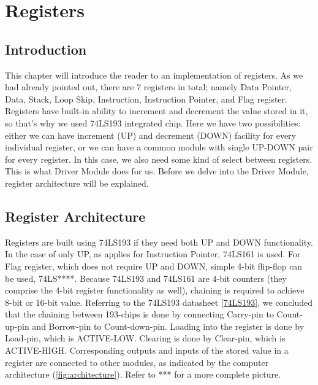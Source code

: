 \section{Registers} \label{sec:registers}
\subsection{Introduction}
This chapter will introduce the reader to an implementation of registers. As we had already pointed out, there are 7 registers in total; namely Data Pointer, Data, Stack, Loop Skip, Instruction, Instruction Pointer, and Flag register. Registers have built-in ability to increment and decrement the value stored in it, so that's why we used 74LS193 integrated chip. Here we have two possibilities: either we can have increment (UP) and decrement (DOWN) facility for every individual register, or we can have a common module with single UP-DOWN pair for every register. In this case, we also need some kind of select between registers. This is what Driver Module does for us. Before we delve into the Driver Module, register architecture will be explained.

\subsection{Register Architecture}
Registers are built using 74LS193 if they need both UP and DOWN functionality. In the case of only UP, as applies for Instruction Pointer, 74LS161 is used. For Flag register, which does not require UP and DOWN, simple 4-bit flip-flop can be used, 74LS****. Because 74LS193 and 74LS161 are 4-bit counters (they comprise the 4-bit register functionality as well), chaining is required to achieve 8-bit or 16-bit value. Referring to the 74LS193 datasheet \ref{74LS193}, we concluded that the chaining between 193-chips is done by connecting Carry-pin to Count-up-pin and Borrow-pin to Count-down-pin. Loading into the register is done by Load-pin, which is ACTIVE-LOW. Clearing is done by Clear-pin, which is ACTIVE-HIGH. Corresponding outputs and inputs of the stored value in a register are connected to other modules, as indicated by the computer architecture (\ref{fig:architecture}). Refer to *** for a more complete picture.

